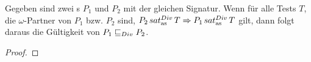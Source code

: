 \begin{Lem}
  \label{DivTestVerfeinLem}
  Gegeben sind zwei \MEIO{}s $P_1$ und $P_2$ mit der gleichen Signatur. Wenn
  für alle Tests $T$, die $\omega$-Partner von $P_1$ bzw. $P_2$ sind, $P_2
  \hspace{0.05cm}sat_\mathrm{as}^{Div}\hspace{0.05cm} T\Rightarrow P_1 \hspace{0.05cm}sat_\mathrm{as}^{Div}\hspace{0.05cm} T$ gilt, dann folgt daraus die Gültigkeit
  von $P_1 \sqsubseteq  _{Div} P_2$.
\end{Lem}
\begin{proof}
\end{proof}


